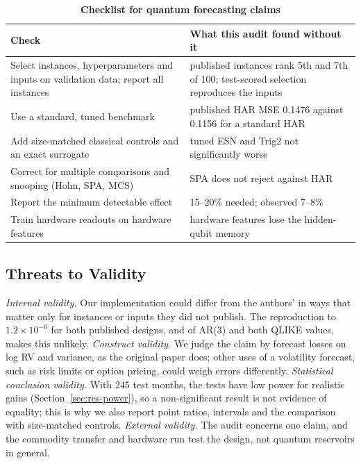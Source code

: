 \documentclass{ieeeaccess}
\begin{document}
\begin{table}[t]
\caption{\textbf{Checklist for quantum forecasting claims}}
\label{tab:checklist}
\setlength{\tabcolsep}{3pt}
\begin{tabular}{|p{110pt}|p{120pt}|}
\hline
Check & What this audit found without it\\
\hline
Select instances, hyperparameters and inputs on validation data; report all instances & published instances rank 5th and 7th of 100; test-scored selection reproduces the inputs\\
Use a standard, tuned benchmark & published HAR MSE 0.1476 against 0.1156 for a standard HAR\\
Add size-matched classical controls and an exact surrogate & tuned ESN and Trig2 not significantly worse\\
Correct for multiple comparisons and snooping (Holm, SPA, MCS) & SPA does not reject against HAR\\
Report the minimum detectable effect & 15--20\% needed; observed 7--8\%\\
Train hardware readouts on hardware features & hardware features lose the hidden-qubit memory\\
\hline
\end{tabular}
\end{table}

\subsection{Threats to Validity}
\emph{Internal validity.} Our implementation could differ from the authors' in ways that matter only for instances or inputs they did not publish. The reproduction to $1.2\times10^{-6}$ for both published designs, and of AR(3) and both QLIKE values, makes this unlikely. \emph{Construct validity.} We judge the claim by forecast losses on log RV and variance, as the original paper does; other uses of a volatility forecast, such as risk limits or option pricing, could weigh errors differently. \emph{Statistical conclusion validity.} With 245 test months, the tests have low power for realistic gains (Section~\ref{sec:res-power}), so a non-significant result is not evidence of equality; this is why we also report point ratios, intervals and the comparison with size-matched controls. \emph{External validity.} The audit concerns one claim, and the commodity transfer and hardware run test the design, not quantum reservoirs in general.
\end{document}
